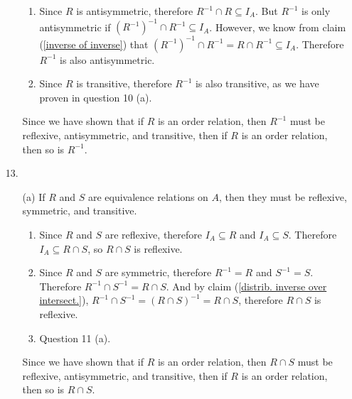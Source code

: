 \documentclass[fleqn]{article}
\begin{document}
\begin{enumerate}
\begin{enumerate}
\begin{enumerate}
			\item %
			Since \(R\) is antisymmetric, therefore \(R^{-1} \cap R \subseteq I_A\). But \(R^{-1}\) is only antisymmetric if \((R^{-1})^{-1} \cap R^{-1} \subseteq I_A\). However, we know from claim (\ref{inverse of inverse}) that \((R^{-1})^{-1} \cap R^{-1} = R \cap R^{-1} \subseteq I_A\). Therefore \(R^{-1}\) is also antisymmetric.

			\item %
			Since \(R\) is transitive, therefore \(R^{-1}\) is also transitive, as we have proven in question 10 (a).
		\end{enumerate}
		Since we have shown that if \(R\) is an order relation, then \(R^{-1}\) must be reflexive, antisymmetric, and transitive, then if \(R\) is an order relation, then so is \(R^{-1}\).
	\end{enumerate}
	
    \item[13.]
	\begin{enumerate}
		\item[(a)]
		If \(R\) and \(S\) are equivalence relations on \(A\), then they must be reflexive, symmetric, and transitive.
		\begin{enumerate}
			\item %
			Since \(R\) and \(S\) are reflexive, therefore \(I_A \subseteq R\) and \(I_A \subseteq S\). Therefore \(I_A \subseteq R \cap S\), so \(R \cap S\) is reflexive.

			\item %
			Since \(R\) and \(S\) are symmetric, therefore \(R^{-1} = R\) and \(S^{-1} = S\). Therefore \(R^{-1} \cap S^{-1} = R \cap S\). And by claim (\ref{distrib. inverse over intersect.}), \(R^{-1} \cap S^{-1} = (R \cap S)^{-1} = R \cap S\), therefore \(R \cap S\) is reflexive.

			\item %
			Question 11 (a).
		\end{enumerate}
		Since we have shown that if \(R\) is an order relation, then \(R \cap S\) must be reflexive, antisymmetric, and transitive, then if \(R\) is an order relation, then so is \(R \cap S\).


\end{enumerate}
\end{enumerate}
\end{document}

